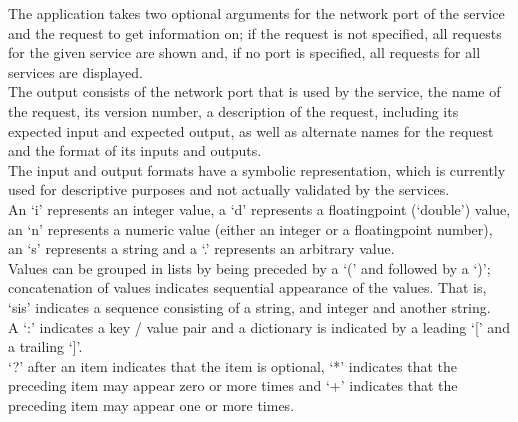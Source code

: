 The application takes two optional arguments for the \yarp{} network port of the service
and the request to get information on; if the request is not specified, all requests for
the given service are shown and, if no port is specified, all requests for all services
are displayed.
\insertFullUtilityParameters\\

The output consists of the \yarp{} network port that is used by the service, the name of
the request, its version number, a description of the request, including its expected
input and expected output, as well as alternate names for the request and the format of
its inputs and outputs.\\

The input and output formats have a symbolic representation, which is currently used for
descriptive purposes and not actually validated by the services.\\

An `i' represents an integer value, a `d' represents a floating\longDash{}point (`double')
value, an `n' represents a numeric value (either an integer or a floating\longDash{}point
number), an `s' represents a string and a `.' represents an arbitrary value.\\

Values can be grouped in lists by being preceded by a `(' and followed by a `)';
concatenation of values indicates sequential appearance of the values.
That is, `sis' indicates a sequence consisting of a string, and integer and another
string.\\

A `:' indicates a key / value pair and a dictionary is indicated by a leading `[' and a
trailing `]'.\\

`?' after an item indicates that the item is optional, `*' indicates that the preceding
item may appear zero or more times and `+' indicates that the preceding item may appear
one or more times.\\

